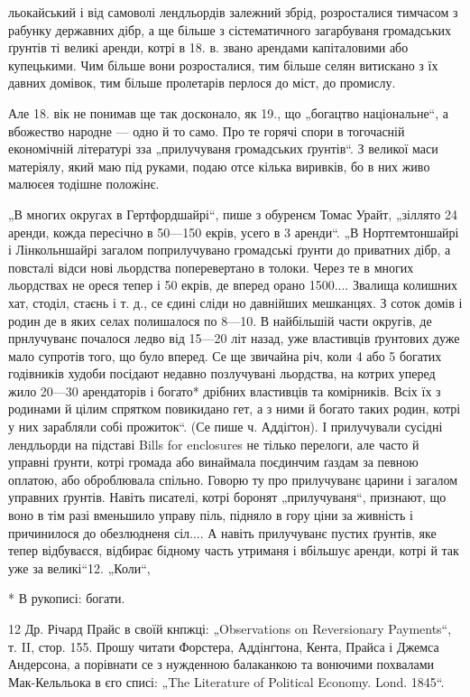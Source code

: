 льокайський і від самоволі лендльордів залежний збрід, розросталися тимчасом з рабунку державних
дібр, а ще більше з сістематичного загарбуваня громадських ґрунтів ті великі аренди, котрі в 18. в.
звано арендами капіталовими або купецькими. Чим більше вони розросталися, тим більше селян витискано
з їх давних домівок, тим більше пролетарів перлося до міст, до промислу.

Але 18. вік не понимав ще так досконало, як 19., що „богацтво національне“, а вбожество народне —
одно й то само. Про те горячі спори в тогочасній економічній літературі зза „прилучуваня громадських
ґрунтів“. З великої
маси матеріялу, який маю під руками, подаю отсе кілька виривків, бо в них живо малюєея тодішне
положінє.

„В многих округах в Гертфордшайрі“, пише з обуренєм Томас Урайт, „зіллято 24 аренди, кожда пересічно
в 50—150 екрів, усего в 3 аренди“. „В Нортгемтоншайрі і Лінкольншайрі загалом поприлучувано
громадські ґрунти до приватних дібр, а повсталі відси нові льордства поперевертано в толоки. Через
те в многих льордствах не ореся тепер і 50 екрів, де вперед орано 1500.... Звалища колишних хат,
стоділ, стаєнь і т. д., се єдині сліди но давнійших мешканцях. З соток домів і родин де в яких селах
полишалося по 8—10. В найбільшій части округів, де прнлучуванє почалося ледво від 15—20 літ назад,
уже властивців ґрунтових дуже мало супротів того, що було вперед. Се ще звичайна річ, коли 4 або 5
богатих годівників худоби посідают недавно позлучувані льордства, на котрих уперед жило 20—30
арендаторів і богато* дрібних властивців та комірників. Всіх їх з родинами й цілим спрятком
повикидано гет, а з ними й богато таких родин, котрі у них зарабляли собі прожиток“. (Се пише ч.
Аддіґтон). І прилучували сусідні лендльорди на підставі Bills for enclosures не тілько перелоги, але
часто й управні ґрунти, котрі громада або винаймала поєдинчим ґаздам за певною оплатою, або
оброблювала спільно. Говорю ту про прилучуванє царини
і загалом управних ґрунтів. Навіть писателі, котрі боронят „прилучуваня“, признают, що воно в тім
разі вменьшило управу піль, підняло в гору ціни за живність і причинилося до обезлюдненя сіл.... А
навіть прилучуванє пустих ґрунтів, яке тепер відбуваєся, відбирає бідному часть утриманя
і вбільшує аренди, котрі й так уже за великі“12.  „Коли“,

* В рукописі: богати.

12 Др. Річард Прайс в своїй кнпжці: „Observations on Reversionary
Payments“, т. II, стор. 155. Прошу читати Форстера, Аддінґтона, Кента,
Прайса і Джемса Андерсона, а порівнати се з нужденною балаканкою
та вонючими похвалами Мак-Кельльока в єго списі: „The Literature of
Political Economy. Lond. 1845“.
